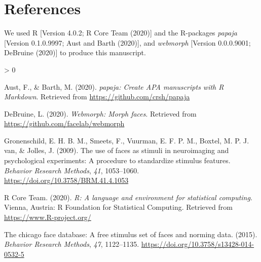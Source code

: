 \documentclass[
  english,
  man]{apa6}
\newlength{\cslhangindent}
\newenvironment{CSLReferences}[2] %
 {%
  \setlength{\parindent}{0pt}
  \ifodd #1 \everypar{\setlength{\hangindent}{\cslhangindent}}\ignorespaces\fi
  \ifnum #2 > 0
  \setlength{\parskip}{#2\baselineskip}
  \fi
 }%
 {}
\begin{document}
\newpage

\hypertarget{references}{%
\section{References}\label{references}}

We used R {[}Version 4.0.2; R Core Team (2020){]} and the R-packages \emph{papaja} {[}Version 0.1.0.9997; Aust and Barth (2020){]}, and \emph{webmorph} {[}Version 0.0.0.9001; DeBruine (2020){]} to produce this manuscript.

\begingroup
\setlength{\parindent}{-0.5in}
\setlength{\leftskip}{0.5in}

\hypertarget{refs}{}
\begin{CSLReferences}{1}{0}
\leavevmode\hypertarget{ref-R-papaja}{}%
Aust, F., \& Barth, M. (2020). \emph{{papaja}: {Create} {APA} manuscripts with {R Markdown}}. Retrieved from \url{https://github.com/crsh/papaja}

\leavevmode\hypertarget{ref-R-webmorph}{}%
DeBruine, L. (2020). \emph{Webmorph: Morph faces}. Retrieved from \url{https://github.com/facelab/webmorph}

\leavevmode\hypertarget{ref-Gronenschild_2009}{}%
Gronenschild, E. H. B. M., Smeets, F., Vuurman, E. F. P. M., Boxtel, M. P. J. van, \& Jolles, J. (2009). The use of faces as stimuli in neuroimaging and psychological experiments: A procedure to standardize stimulus features. \emph{Behavior Research Methods}, \emph{41}, 1053--1060. \url{https://doi.org/10.3758/BRM.41.4.1053}

\leavevmode\hypertarget{ref-R-base}{}%
R Core Team. (2020). \emph{R: A language and environment for statistical computing}. Vienna, Austria: R Foundation for Statistical Computing. Retrieved from \url{https://www.R-project.org/}

\leavevmode\hypertarget{ref-CFD_2015}{}%
The chicago face database: A free stimulus set of faces and norming data. (2015). \emph{Behavior Research Methods}, \emph{47}, 1122--1135. \url{https://doi.org/10.3758/s13428-014-0532-5}

\end{CSLReferences}

\endgroup
\end{document}
